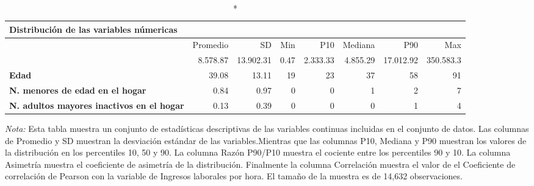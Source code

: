 \centering \footnotesize \setlength{\tabcolsep}{4pt} \renewcommand{\arraystretch}{0.8}
\begingroup
\fontsize{7.0pt}{8.5pt}\selectfont
\begin{longtable}{lrrrrrrr}
\caption*{
{\large Distribución de las variables númericas}
} \\ 
\toprule
  & Promedio & SD & Min & P10 & Mediana & P90 & Max \\ 
\midrule\addlinespace[2.5pt]
{\bfseries Ingresos laborales por hora} & 8.578.87 & 13.902.31 & 0.47 & 2.333.33 & 4.855.29 & 17.012.92 & 350.583.3 \\ 
{\bfseries Edad} & 39.08 & 13.11 & 19 & 23 & 37 & 58 & 91 \\ 
{\bfseries N. menores de edad en el hogar} & 0.84 & 0.97 & 0 & 0 & 1 & 2 & 7 \\ 
{\bfseries N. adultos mayores inactivos en el hogar} & 0.13 & 0.39 & 0 & 0 & 0 & 1 & 4 \\ 
\bottomrule
\end{longtable}
\endgroup
\begin{minipage}{0.8\textwidth}
                                   \begin{tablenotes}
                                   \item \footnotesize \textit{Nota:} Esta tabla muestra un conjunto de estadísticas descriptivas de las variables continuas incluidas en el conjunto de datos.
                                   Las columnas de Promedio y SD muestran la desviación estándar de las variables.Mientras que las columnas P10, Mediana y P90 muestran los valores de la distribución en los percentiles 10, 50 y 90.
                                   La columna Razón P90/P10 muestra el cociente entre los percentiles 90 y 10.
                                   La columna Asimetría muestra el coeficiente de asimetría de la distribución.
                                   Finalmente la columna Correlación muestra el valor de el Coeficiente de correlación de Pearson con la variable de Ingresos laborales por hora.
                                   El tamaño de la muestra es de 14,632 observaciones.
                                   \end{tablenotes}
                                   \end{minipage}
